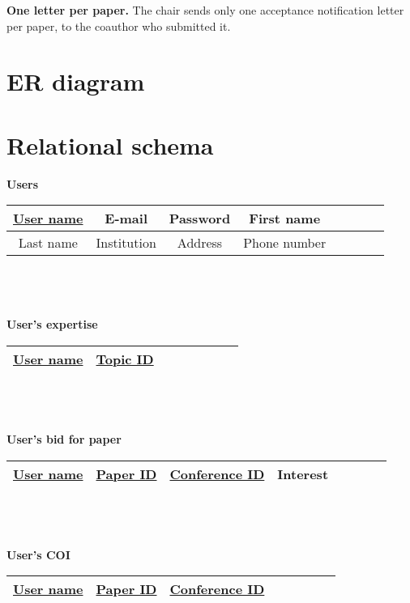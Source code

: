\documentclass[12pt]{article}
\renewcommand{\bf}{\bfseries}
\newcommand{\<}{\langle}
\renewcommand{\>}{\rangle}
\begin{document}
{\bf One letter per paper.} The chair sends only one acceptance notification letter per paper, to the coauthor who submitted it.

\part{ER diagram}



\part{Relational schema}

\textbf{Users}\\
\begin{tabular}{|c|c|c|c|c|c|c|c|}
\hline 
\underline{User name} & E-mail & Password & First name\\ 
\hline 
Last name & Institution & Address & Phone number\\
\hline 
\end{tabular}
~\\
~\\
~\\
\textbf{User's expertise}\\
\begin{tabular}{|c|c|c|c|c|c|c|c|}
\hline 
\underline{User name} & \underline{Topic ID}\\ 
\hline 
\end{tabular}
~\\
~\\
~\\
\textbf{User's bid for paper}\\
\begin{tabular}{|c|c|c|c|c|c|c|c|}
\hline 
\underline{User name}&
\underline{Paper ID}&
\underline{Conference ID}&
Interest\\
\hline 
\end{tabular}
~\\
~\\
~\\
\textbf{User's COI}\\
\begin{tabular}{|c|c|c|c|c|c|c|c|}
\hline 
\underline{User name}&
\underline{Paper ID}&
\underline{Conference ID}\\
\hline 
\end{tabular}
~\\
\end{document}
